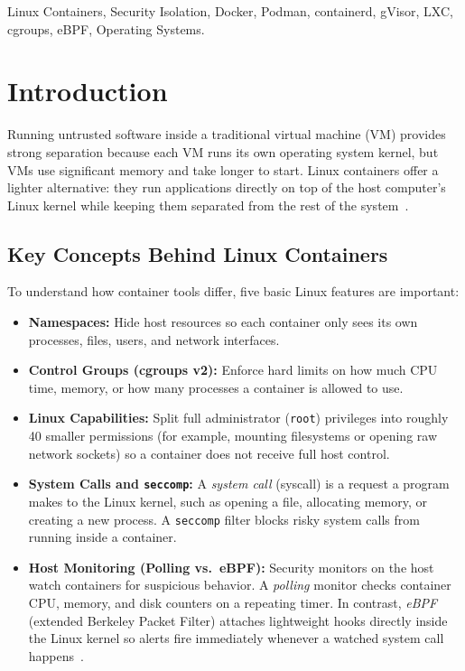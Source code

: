 \documentclass[conference]{IEEEtran}
\begin{document}
\begin{IEEEkeywords}
Linux Containers, Security Isolation, Docker, Podman, containerd, gVisor, LXC, cgroups, eBPF, Operating Systems.
\end{IEEEkeywords}

\section{Introduction}
Running untrusted software inside a traditional virtual machine (VM) provides strong separation because each VM runs its own operating system kernel, but VMs use significant memory and take longer to start. Linux containers offer a lighter alternative: they run applications directly on top of the host computer's Linux kernel while keeping them separated from the rest of the system~\cite{felter2015,sultan2019}.

\subsection{Key Concepts Behind Linux Containers}
To understand how container tools differ, five basic Linux features are important:
\begin{itemize}
    \item \textbf{Namespaces:} Hide host resources so each container only sees its own processes, files, users, and network interfaces.
    \item \textbf{Control Groups (cgroups v2):} Enforce hard limits on how much CPU time, memory, or how many processes a container is allowed to use.
    \item \textbf{Linux Capabilities:} Split full administrator (\texttt{root}) privileges into roughly 40 smaller permissions (for example, mounting filesystems or opening raw network sockets) so a container does not receive full host control.
    \item \textbf{System Calls and \texttt{seccomp}:} A \textit{system call} (syscall) is a request a program makes to the Linux kernel, such as opening a file, allocating memory, or creating a new process. A \texttt{seccomp} filter blocks risky system calls from running inside a container.
    \item \textbf{Host Monitoring (Polling vs.\ eBPF):} Security monitors on the host watch containers for suspicious behavior. A \textit{polling} monitor checks container CPU, memory, and disk counters on a repeating timer. In contrast, \textit{eBPF} (extended Berkeley Packet Filter) attaches lightweight hooks directly inside the Linux kernel so alerts fire immediately whenever a watched system call happens~\cite{gregg2019}.
\end{itemize}
\end{document}
